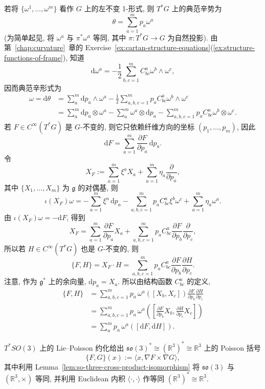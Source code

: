 \begin{RiemannProof}
若将 $\{\omega^1,\ldots,\omega^m\}$ 看作 $G$ 上的左不变 1-形式, 则 $T^*G$ 上的典范辛势为
\[
  \theta=\sum_{a=1}^m p_a\omega^a
\]
(为简单起见, 将 $\omega^a$ 与 $\pi^*\omega^a$ 等同, 其中 $\pi:T^*G\to G$ 为自然投影). 由第~\ref{chap:curvature}~章的 Exercise~\ref{ex:cartan-structure-equations}(\ref{ex:structure-functions-of-frame}), 知道
\[
  \mathrm{d}\omega^a=-\frac{1}{2}\sum_{b,c=1}^m C_{bc}^a\omega^b\wedge\omega^c,
\]
因而典范辛形式为
\begin{align*}
  \omega=\mathrm{d}\theta
  &=\sum_a^m\mathrm{d}p_a\wedge\omega^a-\frac{1}{2}
    \sum_{a,b,c=1}^m p_aC_{bc}^a\omega^b\wedge\omega^c\\
  &=\sum_a^m\mathrm{d}p_a\otimes\omega^a-\sum_a^m\omega^a\otimes\mathrm{d}p_a
    -\sum_{a,b,c=1}^m p_aC_{bc}^a\omega^b\otimes\omega^c.
\end{align*}
若 $F\in C^\infty(T^*G)$ 是 $G$-不变的, 则它只依赖纤维方向的坐标 $(p_1,\ldots,p_m)$, 因此
\[
  \mathrm{d}F=\sum_{a=1}^m\frac{\partial F}{\partial p_a}\,\mathrm{d}p_a.
\]
令
\[
  X_F:=\sum_{a=1}^m\xi^aX_a+\sum_{a=1}^m\eta_a\frac{\partial}{\partial p_a},
\]
其中 $\{X_1,\ldots,X_m\}$ 为 $\mathfrak{g}$ 的对偶基, 则
\[
  \iota(X_F)\omega=-\sum_{a=1}^m\xi^a\,\mathrm{d}p_a
    -\sum_{a,b,c=1}^m p_aC_{bc}^a\xi^b\omega^c+\sum_{a=1}^m\eta_a\omega^a.
\]
由 $\iota(X_F)\omega=-\mathrm{d}F$, 得到
\[
  X_F=\sum_{a=1}^m\frac{\partial F}{\partial p_a}X_a
    +\sum_{a,b,c=1}^m p_aC_{bc}^a\frac{\partial F}{\partial p_b}\frac{\partial}{\partial p_c},
\]
所以若 $H\in C^\infty(T^*G)$ 也是 $G$-不变的, 则
\[
  \{F,H\}=X_F\cdot H=\sum_{a,b,c=1}^m p_aC_{bc}^a
      \frac{\partial F}{\partial p_b}\frac{\partial H}{\partial p_c}.
\]
注意, 作为 $\mathfrak{g}^*$ 上的余向量, $\mathrm{d}p_a=X_a$. 所以由结构函数 $C_{bc}^a$ 的定义,
\begin{align*}
  \{F,H\}
  &=\sum_{a,b,c=1}^m p_a\,\omega^a([X_b,X_c])
      \frac{\partial F}{\partial p_b}\frac{\partial H}{\partial p_c}\\
  &=\sum_{a,b,c=1}^m p_a\,\omega^a\left(
        \left[\frac{\partial F}{\partial p_b}X_b,\frac{\partial H}{\partial p_c}X_c\right]\right)\\
  &=\sum_a^m p_a\,\omega^a([\mathrm{d}F,\mathrm{d}H]).
\end{align*}
\end{RiemannProof}

\begin{RiemannExample}\label{ex:rigid-body-as-reduced-hamiltonian-system}
$T^*SO(3)$ 上的 Lie–Poisson 约化给出 $\mathfrak{so}(3)^*\cong(\mathbb{R}^3)^*\cong\mathbb{R}^3$ 上的 Poisson 括号
\[
  \{F,G\}(x):=\langle x,\nabla F\times\nabla G\rangle,
\]
其中利用 Lemma~\ref{lem:so-three-cross-product-isomorphism} 将 $\mathfrak{so}(3)$ 与 $(\mathbb{R}^3,\times)$ 等同, 并利用 Euclidean 内积 $\langle\cdot,\cdot\rangle$ 作等同 $(\mathbb{R}^3)^*\cong\mathbb{R}^3$.
\end{RiemannExample}

